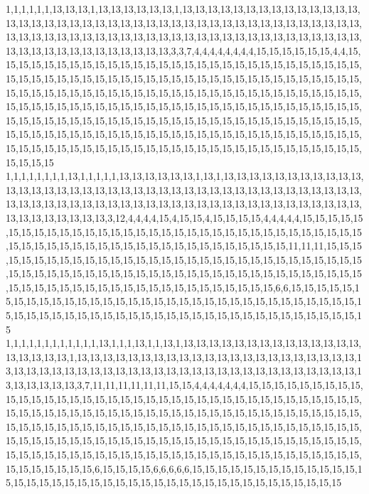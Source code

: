 1,1,1,1,1,1,13,13,13,1,13,13,13,13,13,13,1,13,13,13,13,13,13,13,13,13,13,13,13,13,13,13,13,13,13,13,13,13,13,13,13,13,13,13,13,13,13,13,13,13,13,13,13,13,13,13,13,13,13,13,13,13,13,13,13,13,13,13,13,13,13,13,13,13,13,13,13,13,13,13,13,13,13,13,13,13,13,13,13,13,13,13,13,13,13,13,13,13,13,13,3,3,7,4,4,4,4,4,4,4,4,15,15,15,15,15,15,4,4,15,15,15,15,15,15,15,15,15,15,15,15,15,15,15,15,15,15,15,15,15,15,15,15,15,15,15,15,15,15,15,15,15,15,15,15,15,15,15,15,15,15,15,15,15,15,15,15,15,15,15,15,15,15,15,15,15,15,15,15,15,15,15,15,15,15,15,15,15,15,15,15,15,15,15,15,15,15,15,15,15,15,15,15,15,15,15,15,15,15,15,15,15,15,15,15,15,15,15,15,15,15,15,15,15,15,15,15,15,15,15,15,15,15,15,15,15,15,15,15,15,15,15,15,15,15,15,15,15,15,15,15,15,15,15,15,15,15,15,15,15,15,15,15,15,15,15,15,15,15,15,15,15,15,15,15,15,15,15,15,15,15,15,15,15,15,15,15,15,15,15,15,15,15,15,15,15,15,15,15,15,15,15,15,15,15,15,15,15,15,15,15,15,15,15,15,15,15,15,15,15
1,1,1,1,1,1,1,1,13,1,1,1,1,1,13,13,13,13,13,13,1,13,1,13,13,13,13,13,13,13,13,13,13,13,13,13,13,13,13,13,13,13,13,13,13,13,13,13,13,13,13,13,13,13,13,13,13,13,13,13,13,13,13,13,13,13,13,13,13,13,13,13,13,13,13,13,13,13,13,13,13,13,13,13,13,13,13,13,13,13,13,13,13,13,13,13,13,13,3,12,4,4,4,4,15,4,15,15,4,15,15,15,15,4,4,4,4,4,15,15,15,15,15,15,15,15,15,15,15,15,15,15,15,15,15,15,15,15,15,15,15,15,15,15,15,15,15,15,15,15,15,15,15,15,15,15,15,15,15,15,15,15,15,15,15,15,15,15,15,15,15,15,15,11,11,11,15,15,15,15,15,15,15,15,15,15,15,15,15,15,15,15,15,15,15,15,15,15,15,15,15,15,15,15,15,15,15,15,15,15,15,15,15,15,15,15,15,15,15,15,15,15,15,15,15,15,15,15,15,15,15,15,15,15,15,15,15,15,15,15,15,15,15,15,15,15,15,15,15,15,15,15,15,15,15,15,6,6,15,15,15,15,15,15,15,15,15,15,15,15,15,15,15,15,15,15,15,15,15,15,15,15,15,15,15,15,15,15,15,15,15,15,15,15,15,15,15,15,15,15,15,15,15,15,15,15,15,15,15,15,15,15,15,15,15,15,15,15,15,15
1,1,1,1,1,1,1,1,1,1,1,1,13,1,1,1,13,1,1,13,1,13,13,13,13,13,13,13,13,13,13,13,13,13,13,13,13,13,13,13,1,13,13,13,13,13,13,13,13,13,13,13,13,13,13,13,13,13,13,13,13,13,13,13,13,13,13,13,13,13,13,13,13,13,13,13,13,13,13,13,13,13,13,13,13,13,13,13,13,13,13,13,13,13,13,13,13,3,7,11,11,11,11,11,11,15,15,4,4,4,4,4,4,4,15,15,15,15,15,15,15,15,15,15,15,15,15,15,15,15,15,15,15,15,15,15,15,15,15,15,15,15,15,15,15,15,15,15,15,15,15,15,15,15,15,15,15,15,15,15,15,15,15,15,15,15,15,15,15,15,15,15,15,15,15,15,15,15,15,15,15,15,15,15,15,15,15,15,15,15,15,15,15,15,15,15,15,15,15,15,15,15,15,15,15,15,15,15,15,15,15,15,15,15,15,15,15,15,15,15,15,15,15,15,15,15,15,15,15,15,15,15,15,15,15,15,15,15,15,15,15,15,15,15,15,15,15,15,15,15,15,15,15,15,15,15,15,15,15,15,15,15,15,15,15,15,15,15,15,15,6,15,15,15,15,6,6,6,6,6,15,15,15,15,15,15,15,15,15,15,15,15,15,15,15,15,15,15,15,15,15,15,15,15,15,15,15,15,15,15,15,15,15,15,15,15,15,15,15,15
